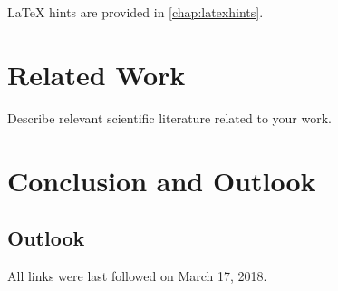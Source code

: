 LaTeX hints are provided in \cref{chap:latexhints}.

\blinddocument

\chapter{Related Work}

Describe relevant scientific literature related to your work.

\chapter{Conclusion and Outlook}
\label{chap:zusfas}

\section*{Outlook}

\printbibliography

All links were last followed on March 17, 2018.

\appendix


\pagestyle{empty}
\renewcommand*{\chapterpagestyle}{empty}
\Versicherung

